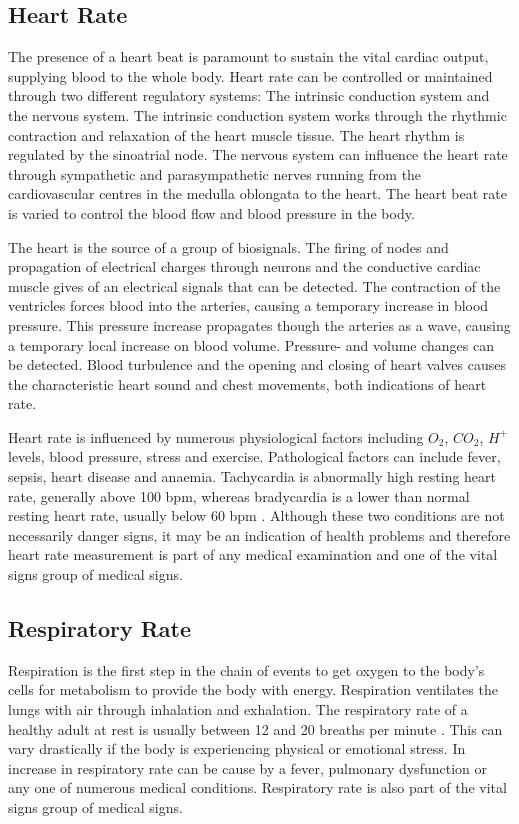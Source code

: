 \subsection{Heart Rate}
The presence of a heart beat is paramount to sustain the vital cardiac output, supplying blood to the whole body. Heart rate can be controlled or maintained through two different regulatory systems: The intrinsic conduction system and the nervous system. The intrinsic conduction system works through the rhythmic contraction and relaxation of the heart muscle tissue. The heart rhythm is regulated by the sinoatrial node. The nervous system can influence the heart rate through sympathetic and parasympathetic nerves running from the cardiovascular centres in the medulla oblongata to the heart. The heart beat rate is varied to control the blood flow and blood pressure in the body.

\medskip
The heart is the source of a group of biosignals. The firing of nodes and propagation of electrical charges through neurons and the conductive cardiac muscle gives of an electrical signals that can be detected. The contraction of the  ventricles forces blood into the arteries, causing a temporary increase in blood pressure. This pressure increase propagates though the arteries as a wave, causing a temporary local increase on blood volume. Pressure- and volume changes can be detected. Blood turbulence and the opening and closing of heart valves causes the characteristic heart sound and chest movements, both indications of heart rate.

\medskip
Heart rate is influenced by numerous physiological factors including $O_2$, $CO_2$, $H^+$ levels, blood pressure, stress and exercise. Pathological factors can include fever, sepsis, heart disease and anaemia. Tachycardia is abnormally high resting heart rate, generally above 100 bpm, whereas bradycardia is a lower than normal resting heart rate, usually below 60 bpm \citep{normalRestingHR}. Although these two conditions are not necessarily danger signs, it may be an indication of health problems and therefore heart rate measurement is part of any medical examination and one of the vital signs group of medical signs.

\subsection{Respiratory Rate}
Respiration is the first step in the chain of events to get oxygen to the body's cells for metabolism to provide the body with energy. Respiration ventilates the lungs with air through inhalation and exhalation. The respiratory rate of a healthy adult at rest is usually between 12 and 20 breaths per minute \citep{medscapeBreathingRate}. This can vary drastically if the body is experiencing physical or emotional stress. In increase in respiratory rate can be cause by a fever, pulmonary dysfunction or any one of numerous medical conditions. Respiratory rate is also part of the vital signs group of medical signs.

